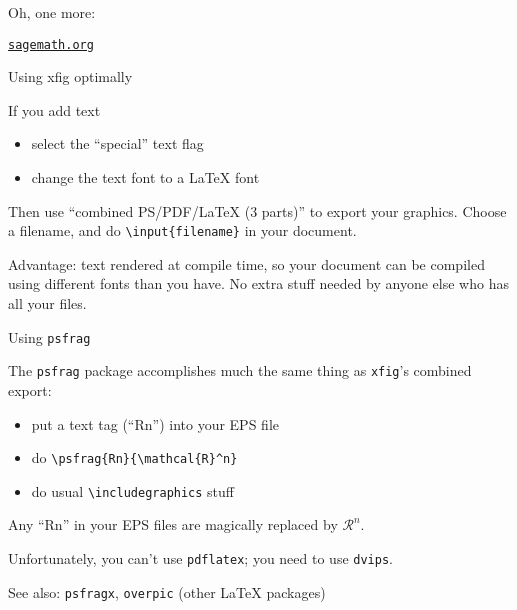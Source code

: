\documentclass{beamer}
\newcommand{\myhref}[1]{\href{http://#1}{\texttt{#1}}}
\begin{document}
\begin{frame}
  Oh, one more:

  \begin{center}
  \scalebox{7}{Sage!}

  \vspace{10pt}

  \myhref{sagemath.org}
  \end{center}

\end{frame}

\begin{frame}{Using xfig optimally}

  If you add text
  \begin{itemize}
    \item select the ``special'' text flag
    \item change the text font to a \LaTeX{} font
  \end{itemize}

  Then use ``combined PS/PDF/LaTeX (3 parts)'' to export your graphics.
  Choose a filename, and do \texttt{\textbackslash input\{filename\}} in
  your document.

  \pause\vspace{10pt}

  Advantage: text rendered at compile time, so your document can be
  compiled using different fonts than you have. No extra stuff needed by
  anyone else who has all your files.

\end{frame}

\begin{frame}[fragile]{Using \texttt{psfrag}}

  The \texttt{psfrag} package accomplishes much the same thing as
  \texttt{xfig}'s combined export:

  \begin{itemize}
    \item put a text tag (``Rn'') into your EPS file
    \item do \verb|\psfrag{Rn}{\mathcal{R}^n}|
    \item do usual \texttt{\textbackslash includegraphics} stuff
  \end{itemize}

  Any ``Rn'' in your EPS files are magically replaced by
  $\mathcal{R}^n$.

  Unfortunately, you can't use \texttt{pdflatex}; you need to use
  \texttt{dvips}.

  \vfill

  See also: \texttt{psfragx}, \texttt{overpic} (other \LaTeX{} packages)

\end{frame}
\end{document}
